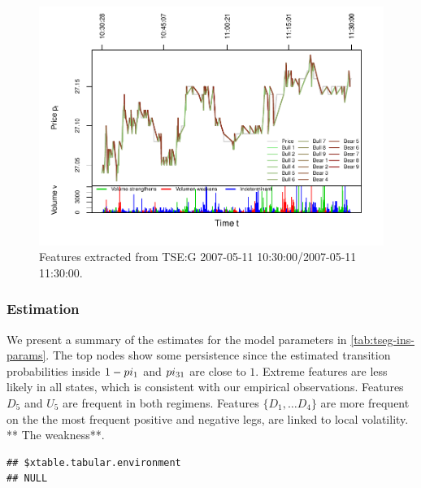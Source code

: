 \documentclass[]{article}
\begin{document}
\begin{figure}[H]
\includegraphics[width=\textwidth,height=0.4 \textheight]{main_files/figure-latex/unnamed-chunk-8-1} \caption{Features extracted from TSE:G 2007-05-11 10:30:00/2007-05-11 11:30:00. \label{tseg-ins-features}}\label{fig:unnamed-chunk-8}
\end{figure}

\subsubsection{Estimation}\label{estimation}

We present a summary of the estimates for the model parameters in
\ref{tab:tseg-ins-params}. The top nodes show some persistence since the
estimated transition probabilities inside \(1 - \\pi_{1}\) and
\(\\pi_{31}\) are close to \(1\). Extreme features are less likely in
all states, which is consistent with our empirical observations.
Features \(D_5\) and \(U_5\) are frequent in both regimens. Features
\(\{D_1, \dots D_4 \}\) are more frequent on the the most frequent
positive and negative legs, are linked to local volatility. ** The
weakness**.

\tiny

\begin{verbatim}
## $xtable.tabular.environment
## NULL
\end{verbatim}
\end{document}
